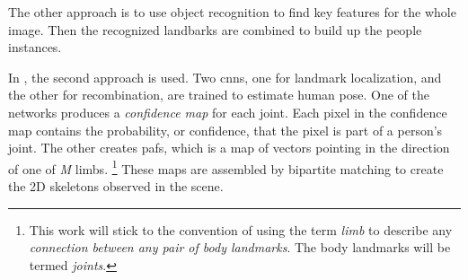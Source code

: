 The other approach is to use object recognition to find key features for the whole image. Then the recognized landbarks are combined to build up the people instances.

In \cite{cao2017realtime}, the second approach is used. Two \gls{cnn}s, one for landmark localization, and the other for recombination, are trained to estimate human pose. One of the networks produces a \emph{confidence map} for each joint. Each pixel in the confidence map contains the probability, or confidence, that the pixel is part of a person's joint. The other creates \gls{paf}s, which is a map of vectors pointing in the direction of one of \emph{M} limbs. \footnote{This work will stick to the convention of using the term \emph{limb} to describe any \emph{connection between any pair of body landmarks}. The body landmarks will be termed \emph{joints}.} These maps are assembled by bipartite matching to create the 2D skeletons observed in the scene.

